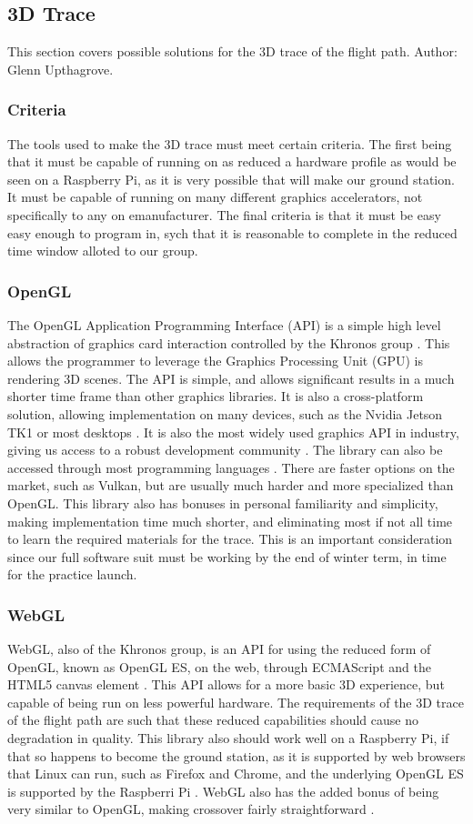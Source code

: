\documentclass[onecolumn, draftclsnofoot,10pt, compsoc]{IEEEtran}
\begin{document}
\subsection{3D Trace}
This section covers possible solutions for the 3D trace of the flight path. Author: Glenn Upthagrove. 
\subsubsection{Criteria} 
The tools used to make the 3D trace must meet certain criteria. The first being that it must be capable of running on as reduced a hardware profile as would be seen on a Raspberry Pi, as it is very possible that will make our ground station. It must be capable of running on many different graphics accelerators, not specifically to any on emanufacturer. The final criteria is that it must be easy easy enough to program in, sych that it is reasonable to complete in the reduced time window alloted to our group. 
\subsubsection{OpenGL}
The OpenGL Application Programming Interface (API) is a simple high level abstraction of graphics card interaction controlled by the Khronos group \cite{refopengl}. This allows the programmer to leverage the Graphics Processing Unit (GPU) is rendering 3D scenes. The API is simple, and allows significant results in a much shorter time frame than other graphics libraries. It is also a cross-platform solution, allowing implementation on many devices, such as the Nvidia Jetson TK1 or most desktops \cite{refopengl} \cite{refjetson}. It is also the most widely used graphics API in industry, giving us access to a robust development community \cite{refopengl}. The library can also be accessed through most programming languages \cite{refopengl}. There are faster options on the market, such as Vulkan, but are usually much harder and more specialized than OpenGL\cite{refvulkan}. This library also has bonuses in personal familiarity and simplicity, making implementation time much shorter, and eliminating most if not all time to learn the required materials for the trace. This is an important consideration since our full software suit must be working by the end of winter term, in time for the practice launch. 
\subsubsection{WebGL}
WebGL, also of the Khronos group, is an API for using the reduced form of OpenGL, known as OpenGL ES, on the web, through ECMAScript and the HTML5 canvas element \cite{refwebgl}. This API allows for a more basic 3D experience, but capable of being run on less powerful hardware. The requirements of the 3D trace of the flight path are such that these reduced capabilities should cause no degradation in quality. This library also should work well on a Raspberry Pi, if that so happens to become the ground station, as it is supported by web browsers that Linux can run, such as Firefox and Chrome, and the underlying OpenGL ES is supported by the Raspberri Pi \cite{refwebgl} \cite{refpi}. WebGL also has the added bonus of being very similar to OpenGL, making crossover fairly straightforward \cite{refwebgl}. 
\end{document}

